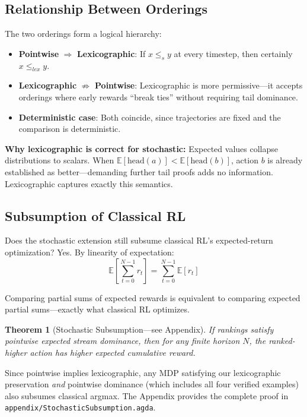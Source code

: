 \documentclass[9pt,a4paper]{article}
\newcommand{\fpath}[1]{\nolinkurl{#1}}
\theoremstyle{plain}
\newtheorem{theorem}{Theorem}
\theoremstyle{definition}
\theoremstyle{remark}
\begin{document}
\subsection{Relationship Between Orderings}

The two orderings form a logical hierarchy:

\begin{itemize}
\item \textbf{Pointwise} $\Rightarrow$ \textbf{Lexicographic}: If $x \le_s y$ at every timestep, then certainly $x \le_{lex} y$.
\item \textbf{Lexicographic} $\not\Rightarrow$ \textbf{Pointwise}: Lexicographic is more permissive---it accepts orderings where early rewards ``break ties'' without requiring tail dominance.
\item \textbf{Deterministic case}: Both coincide, since trajectories are fixed and the comparison is deterministic.
\end{itemize}

\noindent\textbf{Why lexicographic is correct for stochastic:} Expected values collapse distributions to scalars. When $\mathbb{E}[\text{head}(a)] < \mathbb{E}[\text{head}(b)]$, action $b$ is already established as better---demanding further tail proofs adds no information. Lexicographic captures exactly this semantics.

\subsection{Subsumption of Classical RL}

Does the stochastic extension still subsume classical RL's expected-return optimization? Yes. By linearity of expectation:
\[
\mathbb{E}\left[\sum_{t=0}^{N-1} r_t\right] = \sum_{t=0}^{N-1} \mathbb{E}[r_t]
\]

Comparing partial sums of expected rewards is equivalent to comparing expected partial sums---exactly what classical RL optimizes.

\begin{theorem}[Stochastic Subsumption---see Appendix]
If rankings satisfy pointwise expected stream dominance, then for any finite horizon $N$, the ranked-higher action has higher expected cumulative reward.
\end{theorem}

\noindent Since pointwise implies lexicographic, any MDP satisfying our lexicographic preservation \emph{and} pointwise dominance (which includes all four verified examples) also subsumes classical argmax. The Appendix provides the complete proof in \fpath{appendix/StochasticSubsumption.agda}.
\end{document}
